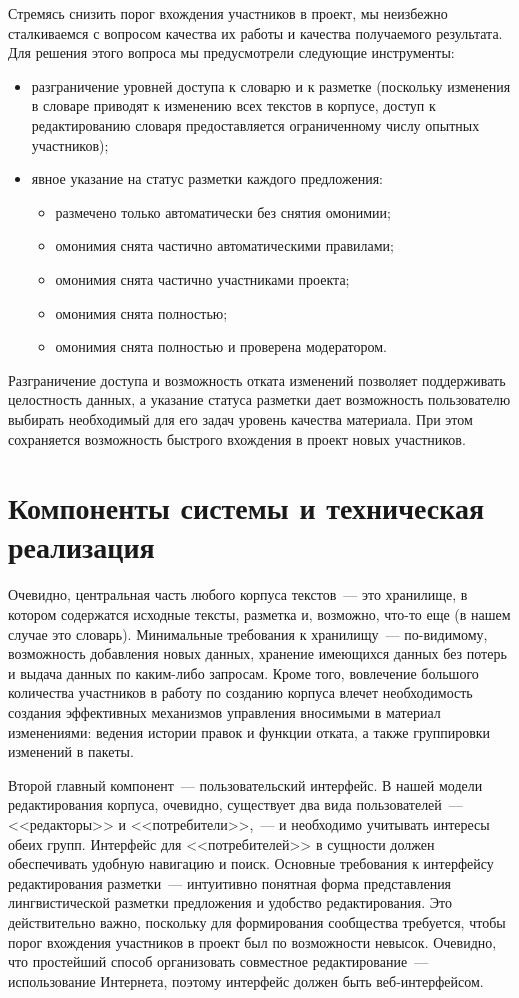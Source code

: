 \documentclass[a4paper]{article}
\begin{document}
Стремясь снизить порог вхождения участников в проект, мы неизбежно сталкиваемся с вопросом качества их работы и качества получаемого результата. Для решения этого вопроса мы предусмотрели следующие инструменты:
\begin{itemize}
\item разграничение уровней доступа к словарю и к разметке (поскольку изменения в словаре приводят к изменению всех текстов в корпусе, доступ к редактированию словаря предоставляется ограниченному числу опытных участников);
\item явное указание на статус разметки каждого предложения:
\begin{itemize}
\item размечено только автоматически без снятия омонимии;
\item омонимия снята частично автоматическими правилами;
\item омонимия снята частично участниками проекта;
\item омонимия снята полностью;
\item омонимия снята полностью и проверена модератором.
\end{itemize}
\end{itemize}

Разграничение доступа и возможность отката изменений позволяет поддерживать целостность данных, а указание статуса разметки дает возможность пользователю выбирать необходимый для его задач уровень качества материала. При этом сохраняется возможность быстрого вхождения в проект новых участников.
\section{Компоненты системы и техническая реализация}
Очевидно, центральная часть любого корпуса текстов~--- это хранилище, в котором содержатся исходные тексты, разметка и, возможно, что-то еще (в нашем случае это словарь). Минимальные требования к хранилищу~--- по-видимому, возможность добавления новых данных, хранение имеющихся данных без потерь и выдача данных по каким-либо запросам. Кроме того, вовлечение большого количества участников в работу по созданию корпуса влечет необходимость создания эффективных механизмов управления вносимыми в материал изменениями: ведения истории правок и функции отката, а также группировки изменений в пакеты.

Второй главный компонент~--- пользовательский интерфейс. В нашей модели редактирования корпуса, очевидно, существует два вида пользователей~--- <<редакторы>> и <<потребители>>,~--- и необходимо учитывать интересы обеих групп. Интерфейс для <<потребителей>> в сущности должен обеспечивать удобную навигацию и поиск. Основные требования к интерфейсу редактирования разметки~--- интуитивно понятная форма представления лингвистической разметки предложения и удобство редактирования. Это действительно важно, поскольку для формирования сообщества требуется, чтобы порог вхождения участников в проект был по возможности невысок. Очевидно, что простейший способ организовать совместное редактирование~--- использование Интернета, поэтому интерфейс должен быть веб-интерфейсом.
\end{document}
